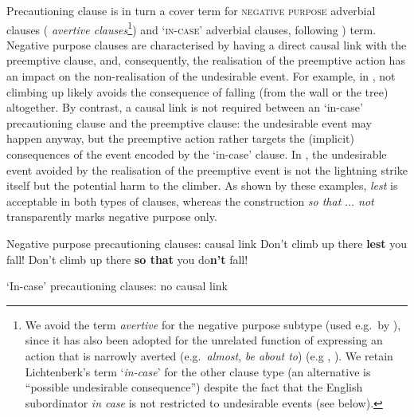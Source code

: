 \documentclass[output=paper,colorlinks,citecolor=brown
]{langscibook}
\begin{document}
Precautioning clause is in turn a cover term for \textsc{negative purpose} adverbial clauses ( \textit{avertive clauses}\footnote{We avoid the term \textit{avertive} for the negative purpose subtype (used e.g.\ by \cite{lichtenberk1995,schmidtkebode2009,vuillermet2018a}), since it has also been adopted for the unrelated function of expressing an action that is narrowly averted (e.g.\ \textit{almost}, \textit{be about to}) (e.g \cite{kuteva2000}, \cite{kutevaetal2019}). We retain Lichtenberk's term `\textit{in-case}' for the other clause type (an alternative is ``possible undesirable consequence'') despite the fact that the English subordinator \textit{in case} is not restricted to undesirable events (see below).}) and `\textsc{in-case}' adverbial clauses, following ) term. Negative purpose clauses are characterised by having a direct causal link with the preemptive clause, and, consequently, the realisation of the preemptive action has an impact on the non-realisation of the undesirable event. For example, in , not climbing up likely avoids the consequence of falling (from the wall or the tree) altogether. By contrast, a causal link is not required between an `in-case' precautioning clause and the preemptive clause: the undesirable event may happen anyway, but the preemptive action rather targets the (implicit) consequences of the event encoded by the `in-case' clause. In , the undesirable event avoided by the realisation of the preemptive event is not the lightning strike itself but the potential harm to the climber. As shown by these examples, \textit{lest} is acceptable in both types of clauses, whereas the construction \textit{so that $\ldots$  not} transparently marks negative purpose only.

\ea \textnormal{Negative purpose precautioning clauses: causal link}
\label{ex:intro6} 
\ea\label{ex:intro6a} Don't climb up there \textbf{lest} you fall!
\ex\label{ex:intro6b} Don't climb up there \textbf{so that} you do\textbf{n't} fall!
\z
\z

\ea \textnormal{`In-case' precautioning clauses: no causal link}
\label{ex:intro7}
\label{ex:intro7b} 
\z
\z
\end{document}
